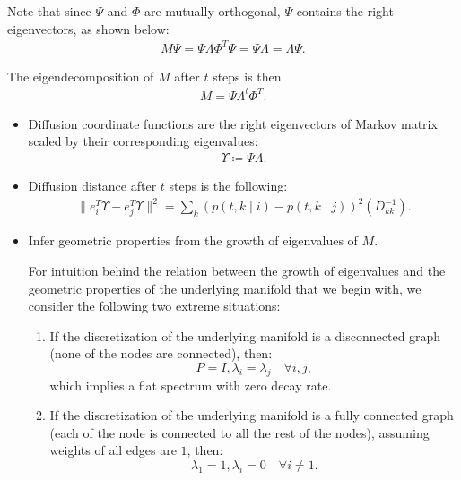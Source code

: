 \begin{enumerate}
    Note that since $\Psi$ and $\Phi$ are mutually orthogonal, $\Psi$ contains the right eigenvectors, as shown below:
     \begin{align}
        M \Psi =  \Psi \Lambda \Phi^T \Psi = \Psi \Lambda =  \Lambda \Psi.
    \end{align}
    
    The eigendecomposition of $M$ after $t$ steps is then
    \begin{align}
        M = \Psi \Lambda^t \Phi^T.
    \end{align}
    \begin{itemize}
        \item Diffusion coordinate functions are the right eigenvectors of Markov matrix scaled by their corresponding eigenvalues: 
        \begin{align}
            \Upsilon \coloneqq \Psi \Lambda.
        \end{align}
        \item Diffusion distance after $t$ steps is the following:
       \begin{align}
            \| e_i^T  \Upsilon - e_j^T \Upsilon  \|^2 = \sum_{k} (p(t,k\mid i) - p(t,k\mid j))^2 (D_{k k}^{-1}).
       \end{align}
       
       \item Infer geometric properties from the growth of eigenvalues of $M$.
       
       For intuition behind the relation between the growth of eigenvalues and the geometric properties of the underlying manifold that we begin with, we consider the following two extreme situations:
       \begin{enumerate}
           \item If the discretization of the underlying manifold is a disconnected graph (none of the nodes are connected), then:
           \[P = I, \lambda_i = \lambda_j \quad \forall i, j, \]
           which implies a flat spectrum with zero decay rate.
           \item If the discretization of the underlying manifold is a fully connected graph (each of the node is connected to all the rest of the nodes), assuming weights of all edges are $1$, then:
            \[\lambda_1 = 1, \lambda_i = 0 \quad \forall i \neq 1.\]
       \end{enumerate}
    \end{itemize}
\end{enumerate}

